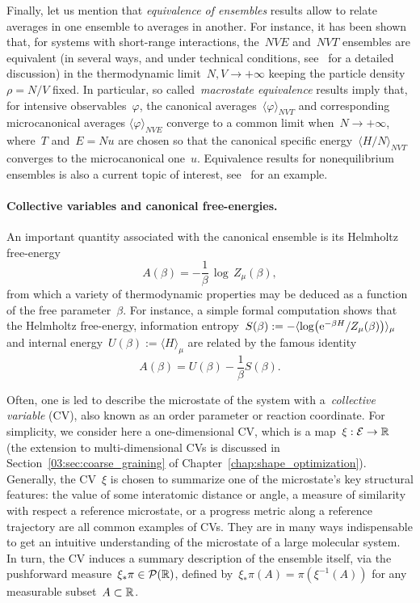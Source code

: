 Finally, let us mention that \textit{equivalence of ensembles} results allow to relate averages in one ensemble to averages in another. For instance, it has been shown that, for systems with short-range interactions, the~$NVE$ and~$NVT$ ensembles are equivalent (in several ways, and under technical conditions, see~\cite{T15} for a detailed discussion) in the thermodynamic limit~$N,V\to +\infty$ keeping the particle density~$\rho = N/V$ fixed.
In particular, so called~\textit{macrostate equivalence} results imply that, for intensive observables~$\varphi$, the canonical averages~$\langle\varphi\rangle_{NVT}$  and corresponding microcanonical averages $\langle \varphi\rangle_{NVE}$ converge to a common limit when~$N\to +\infty$, where~$T$ and~${E=Nu}$ are chosen so that the canonical specific energy~$\langle H/N\rangle_{NVT}$ converges to the microcanonical one~$u$.
Equivalence results for nonequilibrium ensembles is also a current topic of interest, see~\cite{CT13} for an example.

\paragraph{Collective variables and canonical free-energies.}
An important quantity associated with the canonical ensemble is its Helmholtz free-energy
\begin{equation}
    \label{eq:01:helmholtz}
    A(\beta)=-\frac{1}{\beta}\,\log\,Z_\mu(\beta),
\end{equation}
from which a variety of thermodynamic properties may be deduced as a function of the free parameter~$\beta$. For instance, a simple formal computation shows that the Helmholtz free-energy, information entropy~$S(\beta) := -\langle \log(\mathrm{e}^{-\beta H}/Z_\mu(\beta))\rangle_{\mu}$ and internal energy~$U(\beta):=\langle H\rangle_{\mu}$ are related by the famous identity
\begin{equation}
    A(\beta) = U(\beta) - \frac1\beta S(\beta).
\end{equation}

Often, one is led to describe the microstate of the system with a~\textit{collective variable} (CV), also known as an order parameter or reaction coordinate. For simplicity, we consider here a one-dimensional CV, which is a map~$\xi:\mathcal{E}\to\mathbb{R}$ (the extension to multi-dimensional CVs is discussed in Section~\ref{03:sec:coarse_graining} of Chapter~\ref{chap:shape_optimization}).
Generally, the CV~$\xi$ is chosen to summarize one of the microstate's key structural features: the value of some interatomic distance or angle, a measure of similarity with respect a reference microstate, or a progress metric along a reference trajectory are all common examples of CVs.
They are in many ways indispensable to get an intuitive understanding of the microstate of a large molecular system. 
In turn, the CV induces a summary description of the ensemble itself, via the pushforward measure~$\xi_*\pi \in \mathcal P(\mathbb{R})$, defined by~$\xi_*\pi(A) = \pi(\xi^{-1}(A))$ for any measurable subset~$A\subset\mathbb{R}$.

